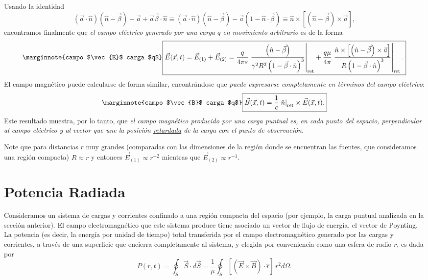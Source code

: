 Usando la identidad
\begin{equation}
(\vec{a}\cdot\hat{n})(\hat{n}-\vec{\beta})-\vec{a}+\vec{a}\vec{\beta}\cdot\hat{n}\equiv (\vec{a}\cdot\hat{n})(\hat{n}-\vec{\beta})-\vec{a} (1-\hat{n}\cdot\vec\beta)\equiv \hat{n}\times\left[ \left( \hat{n}-\vec{\beta}\right)
\times{\vec{a}}\right],
\end{equation}
encontramos finalmente que\textit{ el campo eléctrico generado por una carga $q$ en movimiento arbitrario} es de la forma
\begin{equation}\marginnote{campo $\vec{E}$ carga $q$}
\boxed{\vec{E}(\vec{x},t)=\vec{E}_{(1)}+\vec{E}_{(2)}=\frac{q}{4\pi\varepsilon}\left.\frac{\left(
\hat{n}-\vec{\beta}\right)
}{\gamma^2R^2\left(1-\vec{\beta}\cdot\hat{n}\right)^3}\right|_{\rm ret}+
\frac{q\mu}{4\pi}\left.\frac{\hat{n}\times\left[ \left( \hat{n}-\vec{\beta}\right)
\times{\vec{a}}\right] }{R\left( 1-\vec{\beta}\cdot\hat{n}\right)
^3}\right|_{\rm ret} .} \label{Egen}
\end{equation}
El campo magnético puede calcularse de forma similar, encontrándose que \textit{puede expresarse completamente en términos del campo eléctrico}:
\begin{equation}\marginnote{campo $\vec{B}$ carga $q$}
\boxed{\vec{B}(\vec{x},t)=\frac{1}{c}\left. \hat{n}\right|_{\rm
ret}\times\vec{E}(\vec{x},t) .}
\end{equation}
Este resultado muestra, por lo tanto, que \textit{el campo magnético producido por una carga puntual es, en cada punto del espacio, perpendicular al campo eléctrico y al vector que une la posición \underline{retardada} de la carga con el punto de observación}.

Note que para distancias $r$ muy grandes (comparadas con las dimensiones de la
región donde se encuentran las fuentes, que consideramos una región compacta) $R\approx r$ y entonces
$\vec{E}_{(1)}\propto r^{-2}$ mientras que $\vec{E}_{(2)}\propto
r^{-1}$.


\section{Potencia Radiada}

Consideramos un sistema de cargas y corrientes confinado a una región compacta del espacio (por ejemplo, la carga puntual analizada en la sección anterior). El campo electromagnético que este sistema produce tiene asociado un vector de flujo de energía, el vector de Poynting. La potencia (es decir, la energía por unidad de tiempo) total transferida por el campo electromagnético generado por las cargas y corrientes, a través de una superficie que encierra completamente al sistema, y elegida por conveniencia como una esfera de radio $r$, es dada por
\begin{equation}
P(r,t)=\oint_S \vec{S}\cdot d\vec{S}=\frac{1}{\mu}\oint_S \left[ \left(
\vec{E}\times\vec{B}\right) \cdot \hat{r}\right] \,r^2d\Omega.
\end{equation}


